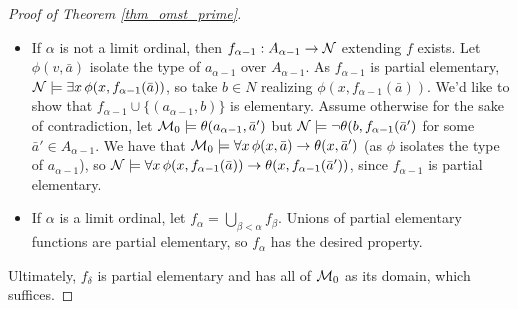 \begin{proof}[Proof of Theorem \ref{thm_omst_prime}]
\begin{itemize}
\item If \(\alpha\) is not a limit ordinal, then \(f_{\alpha-1}: A_{\alpha-1} \to \mathcal{N}\) extending \(f\) exists. 
Let \(\phi(v, \bar{a})\) isolate the type of \(a_{\alpha-1}\) over \(A_{\alpha-1}\). 
As \(f_{\alpha-1}\) is partial elementary, \(\mathcal{N} \models \exists x \, \phi(x, f_{\alpha-1}(\bar{a}))\), so take \(b \in N\) realizing \(\phi(x, f_{\alpha-1}(\bar{a}))\).
We'd like to show that \(f_{\alpha-1} \cup \{(a_{\alpha-1}, b)\}\) is elementary. 
Assume otherwise for the sake of contradiction, let \(\mathcal{M}_0 \models \theta(a_{\alpha-1}, \bar{a}')\) but \(\mathcal{N} \models \neg\theta(b, f_{\alpha-1}(\bar{a}')\) for some \(\bar{a}' \in A_{\alpha-1}\). 
We have that \(\mathcal{M}_0 \models \forall x \, \phi(x, \bar{a}) \to \theta(x, \bar{a}')\) (as \(\phi\) isolates the type of \(a_{\alpha-1}\)), so \(\mathcal{N}\models\forall x \, \phi(x, f_{\alpha-1}(\bar{a})) \to \theta(x, f_{\alpha-1}(\bar{a}'))\), since \(f_{\alpha-1}\) is partial elementary.

\item If \(\alpha\) is a limit ordinal, let \(f_\alpha = \bigcup\limits_{\beta < \alpha}f_\beta\). Unions of partial elementary functions are partial elementary, so \(f_\alpha\) has the desired property.
\end{itemize}
 
\noindent Ultimately, \(f_\delta\) is partial elementary and has all of \(\mathcal{M}_0\) as its domain, which suffices. 
\end{proof}
